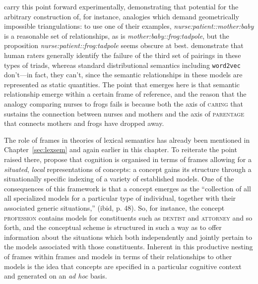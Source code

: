 \cite{ChenEA2017} carry this point forward experimentally, demonstrating that potential for the arbitrary construction of, for instance, analogies which demand geometrically impossible triangulations: to use one of their examples, \emph{nurse:patient::mother:baby} is a reasonable set of relationships, as is \emph{mother:baby::frog:tadpole}, but the proposition \emph{nurse:patient::frog:tadpole} seems obscure at best.  \citeauthor{ChenEA2017} demonstrate that human raters generally identify the failure of the third set of pairings in these types of triads, whereas standard distributional semantics including \texttt{word2vec} don't---in fact, they can't, since the semantic relationships in these models are represented as static quantities.  The point that emerges here is that semantic relationship emerge within a certain frame of reference, and the reason that the analogy comparing nurses to frogs fails is because both the axis of \textsc{caring} that sustains the connection between nurses and mothers and the axis of \textsc{parentage} that connects mothers and frogs have dropped away.

The role of frames in theories of lexical semantics has already been mentioned in Chapter~\ref{sec:lexsem} and again earlier in this chapter.  To reiterate the point raised there, \cite{BarsalouEA1993} propose that cognition is organised in terms of frames allowing for a \emph{situated}, \emph{local} representations of concepts: a concept gains its structure through a situationally specific indexing of a variety of established models.  One of the consequences of this framework is that a concept emerges as the ``collection of all all specialized models for a particular type of individual, together with their associated generic situations,'' (ibid, p. 48).  So, for instance, the concept \textsc{profession} contains models for constituents such as \textsc{dentist} and \textsc{attorney} and so forth, and the conceptual scheme is structured in such a way as to offer information about the situations which both independently and jointly pertain to the models associated with those constituents.  Inherent in this productive nesting of frames within frames and models in terms of their relationships to other models is the idea that concepts are specified in a particular cognitive context and generated on an \emph{ad hoc} basis.

